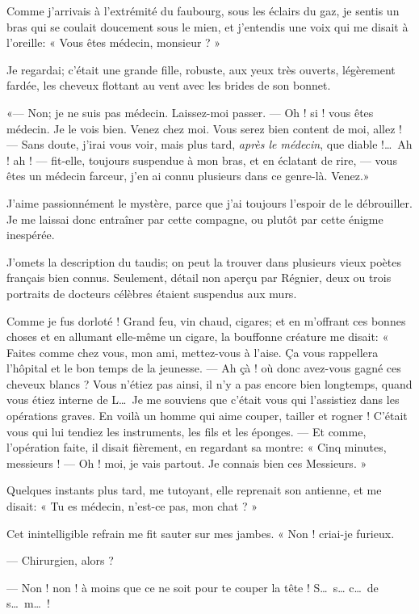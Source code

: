 Comme j’arrivais à l’extrémité du
faubourg, sous les éclairs du gaz, je sentis un bras qui se coulait
doucement sous le mien, et j’entendis une voix qui me
disait à l’oreille: « Vous êtes médecin, monsieur ? »

Je regardai; c’était une grande fille, robuste, aux
yeux très ouverts, légèrement fardée, les cheveux flottant au vent
avec les brides de son bonnet.

«--- Non; je ne suis pas médecin. Laissez{}-moi passer. --- Oh ! si ! vous
êtes médecin. Je le vois bien. Venez chez moi. Vous serez bien content
de moi, allez ! --- Sans doute, j’irai vous voir, mais
plus tard, \textit{après le médecin}, que diable !\ldots\ Ah ! ah ! --- fit{}-elle,
toujours suspendue à mon bras, et en éclatant de rire, --- vous êtes un
médecin farceur, j’en ai connu plusieurs dans ce
genre{}-là. Venez.»

J’aime passionnément le mystère, parce que
j’ai toujours l’espoir de le
débrouiller. Je me laissai donc entraîner par cette compagne, ou plutôt
par cette énigme inespérée.

J’omets la description du taudis; on peut la trouver
dans plusieurs vieux poètes français bien connus. Seulement, détail non
aperçu par Régnier, deux ou trois portraits de docteurs célèbres
étaient suspendus aux murs.

Comme je fus dorloté ! Grand feu, vin chaud, cigares; et en
m’offrant ces bonnes choses et en allumant elle{}-même
un cigare, la bouffonne créature me disait: « Faites comme chez vous,
mon ami, mettez{}-vous à l’aise. Ça vous rappellera
l’hôpital et le bon temps de la jeunesse. --- Ah çà ! où
donc avez{}-vous gagné ces cheveux blancs ? Vous
n’étiez pas ainsi, il n’y a pas
encore bien longtemps, quand vous étiez interne de L\ldots\ Je me souviens
que c’était vous qui l’assistiez dans
les opérations graves. En voilà un homme qui aime couper, tailler et
rogner ! C’était vous qui lui tendiez les instruments,
les fils et les éponges. --- Et comme, l’opération
faite, il disait fièrement, en regardant sa montre: « Cinq minutes,
messieurs ! --- Oh ! moi, je vais partout. Je connais bien ces Messieurs.
»

Quelques instants plus tard, me tutoyant, elle reprenait son antienne,
et me disait: « Tu es médecin, n’est{}-ce pas, mon
chat ? »

Cet inintelligible refrain me fit sauter sur mes jambes. « Non !
criai{}-je furieux.

--- Chirurgien, alors ?

--- Non ! non ! à moins que ce ne soit pour te couper la tête ! S\ldots\ s\ldots
c\ldots\ de s\ldots\ m\ldots\ !

